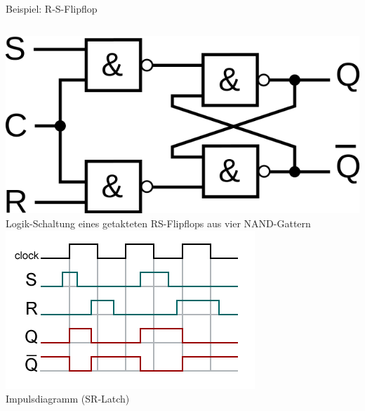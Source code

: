 \begin{frame}{Beispiel: R-S-Flipflop}
  \begin{columns}
    \includegraphics[width=\textwidth,height=.8\textheight,keepaspectratio]{a14/ISO-RS-FF-NAND-with-clock.png}\\
    {\tiny Logik-Schaltung eines getakteten RS-Flipflops aus vier NAND-Gattern \hyperlink{refs}{\cite{wp}}}
    \includegraphics[width=\textwidth,height=.8\textheight,keepaspectratio]{a14/SR_latch_impulse_diagram.png}\\
    {\tiny Impulsdiagramm (SR-Latch) \hyperlink{refs}{\cite{wp}}}
  \end{columns}
\end{frame}


